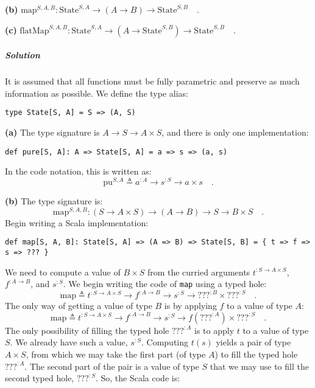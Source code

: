 \textbf{(b)} $\text{map}^{S,A,B}:\text{State}^{S,A}\rightarrow(A\rightarrow B)\rightarrow\text{State}^{S,B}\quad.$

\textbf{(c)} $\text{flatMap}^{S,A,B}:\text{State}^{S,A}\rightarrow(A\rightarrow\text{State}^{S,B})\rightarrow\text{State}^{S,B}\quad.$

\subparagraph{Solution}

It is assumed that all functions must be fully parametric and preserve
as much information as possible. We define the type alias:
\begin{lstlisting}
type State[S, A] = S => (A, S)
\end{lstlisting}

\textbf{(a)} The type signature is $A\rightarrow S\rightarrow A\times S$,
and there is only one implementation:
\begin{lstlisting}
def pure[S, A]: A => State[S, A] = a => s => (a, s)
\end{lstlisting}
In the code notation, this is written as:
\[
\text{pu}^{S,A}\triangleq a^{:A}\rightarrow s^{:S}\rightarrow a\times s\quad.
\]

\textbf{(b)} The type signature is:
\[
\text{map}^{S,A,B}:(S\rightarrow A\times S)\rightarrow(A\rightarrow B)\rightarrow S\rightarrow B\times S\quad.
\]
Begin writing a Scala implementation:
\begin{lstlisting}
def map[S, A, B]: State[S, A] => (A => B) => State[S, B] = { t => f => s => ??? }
\end{lstlisting}
We need to compute a value of $B\times S$ from the curried arguments
$t^{:S\rightarrow A\times S}$, $f^{:A\rightarrow B}$, and $s^{:S}$.
We begin writing the code of \lstinline!map! using a typed hole:
\[
\text{map}\triangleq t^{:S\rightarrow A\times S}\rightarrow f^{:A\rightarrow B}\rightarrow s^{:S}\rightarrow\text{???}^{:B}\times\text{???}^{:S}\quad.
\]
The only way of getting a value of type $B$ is by applying $f$ to
a value of type $A$:
\[
\text{map}\triangleq t^{:S\rightarrow A\times S}\rightarrow f^{:A\rightarrow B}\rightarrow s^{:S}\rightarrow f(\text{???}^{:A})\times\text{???}^{:S}\quad.
\]
The only possibility of filling the typed hole $\text{???}^{:A}$
is to apply $t$ to a value of type $S$. We already have such a value,
$s^{:S}$. Computing $t(s)$ yields a pair of type $A\times S$, from
which we may take the first part (of type $A$) to fill the typed
hole $\text{???}^{:A}$. The second part of the pair is a value of
type $S$ that we may use to fill the second typed hole, $\text{???}^{:S}$.
So, the Scala code is:

